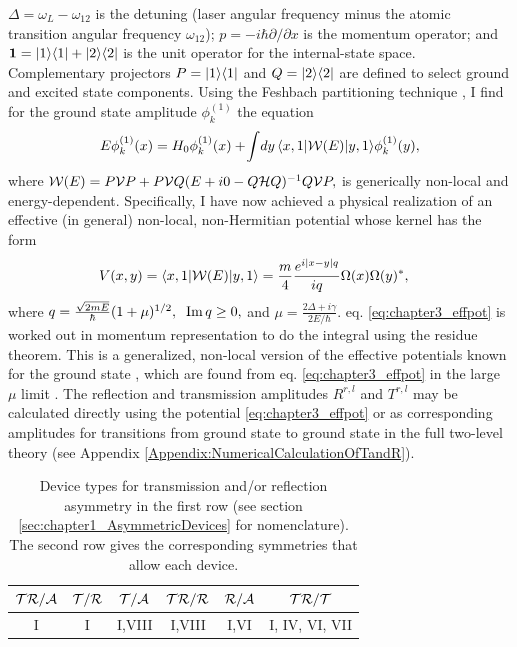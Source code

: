$\Delta=\omega_{L}-\omega_{12}$
is the detuning (laser angular frequency minus the atomic transition
angular frequency $\omega_{12}$);
${p}=-i\hbar\partial/\partial x$ is the momentum operator;
and ${\bf 1}=|1\rangle\langle 1|+|2\rangle\langle 2|$ is the unit operator
for the internal-state space.
Complementary projectors
%
$P=|1\rangle\langle 1|$ and $Q=|2\rangle\langle 2|$
%
are defined to select ground and excited state components.
Using the Feshbach partitioning
technique \cite{Feshbach1958,Feshbach1962,Levine1969},
I find for the ground
state amplitude $\phi_k^{(1)}$ the equation
%
\begin{equation}\label{effecti}
  E\phi_k^{(1)}(x) = H_0\phi_k^{(1)}(x)+\!
  \int\! dy\, \la x,1|{\cal W}(E)|y,1\ra \phi_k^{(1)}(y),
\end{equation}
%
where
%
$
{\cal W}(E)=P{\cal V}P+P{\cal V}Q(E+i0-Q{\cal H}Q)^{-1}Q{\cal V}P,
$
%
is generically non-local and energy-dependent. Specifically, I have now achieved
a physical realization of an effective (in general) non-local, non-Hermitian potential whose kernel has the form
%
\begin{eqnarray}
  \hspace*{-.3cm}V (x,y) = \la x,1|{\cal W}(E)|y,1\ra = \frac{m}{4} \frac{e^{i|x-y|q}}{i q}
  \Omega(x)\Omega(y)^*,
  \label{eq:chapter3_effpot}
\end{eqnarray}
%
%
where
$
q=\frac{\sqrt{2mE}}{\hbar}(1+\mu)^{1/2},\;\;
{\rm Im}\,q\ge 0,
\label{qeq}
$ and
$
\mu=\frac{2\Delta+i\gamma}{2E/\hbar}.
$
%
eq. \eqref{eq:chapter3_effpot} is worked out  in momentum representation to do the integral
using the residue theorem.
This is a generalized, non-local version of the effective potentials known for the ground state
\cite{Chudesnikov1991,Oberthaler1996}, which are found from eq. \eqref{eq:chapter3_effpot}  in the large $\mu$ limit \cite{Ruschhaupt2004a}.
The reflection and transmission amplitudes $R^{r,l}$ and  $T^{r,l}$ may be calculated directly
using the potential \eqref{eq:chapter3_effpot} or as corresponding amplitudes for
transitions from ground state to ground state in the full two-level theory (see Appendix \ref{Appendix:NumericalCalculationOfTandR}).

\begin{table}
  \caption{Device types for  transmission and/or reflection asymmetry in the first row (see section \ref{sec:chapter1_AsymmetricDevices} for nomenclature).
  The second row gives the corresponding symmetries  that allow
  each device.
  \label{devices}}
  \vspace*{.0cm}
  \label{tab:chapter3_table2PhysicalImplementation}
  \centering
  \begin{tabular}{cccccc}
    \hline\hline
    $\cal{TR/A}$ & $\cal{T/R}$ & $\cal{T/A}$ & $\cal{TR/R}$ & $\cal{R/A}$ & $\cal{TR/T}$ \\
    \hline
    I            & I           & I,VIII      & I,VIII       & I,VI        & I, IV, VI, VII
    \\
    \hline\hline
  \end{tabular}
\end{table}
%

